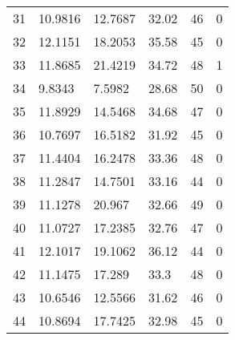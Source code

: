 \begin{tabular}{llllll}
31 & 10.9816 & 12.7687 & 32.02 & 46 & 0 \\ 
32 & 12.1151 & 18.2053 & 35.58 & 45 & 0 \\ 
33 & 11.8685 & 21.4219 & 34.72 & 48 & 1 \\ 
34 & 9.8343 & 7.5982 & 28.68 & 50 & 0 \\ 
35 & 11.8929 & 14.5468 & 34.68 & 47 & 0 \\ 
36 & 10.7697 & 16.5182 & 31.92 & 45 & 0 \\ 
37 & 11.4404 & 16.2478 & 33.36 & 48 & 0 \\ 
38 & 11.2847 & 14.7501 & 33.16 & 44 & 0 \\ 
39 & 11.1278 & 20.967 & 32.66 & 49 & 0 \\ 
40 & 11.0727 & 17.2385 & 32.76 & 47 & 0 \\ 
41 & 12.1017 & 19.1062 & 36.12 & 44 & 0 \\ 
42 & 11.1475 & 17.289 & 33.3 & 48 & 0 \\ 
43 & 10.6546 & 12.5566 & 31.62 & 46 & 0 \\ 
44 & 10.8694 & 17.7425 & 32.98 & 45 & 0 \\ 
\hline 
\end{tabular}